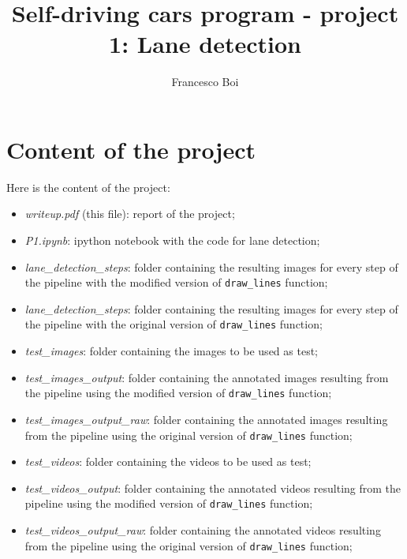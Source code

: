 \documentclass{article}
\author{Francesco Boi}
\title{Self-driving cars program - project  1: Lane detection}
\date{}
\let\cd\lstinline
\begin{document}
\lstset{escapechar=ç,style=customc}
\maketitle
\tableofcontents 
\section{Content of the project}
Here is the content of the project:
\begin{itemize}
\item \textit{writeup.pdf} (this file): report of the project;
\item \textit{P1.ipynb}: ipython notebook with the code for lane detection;
\item \textit{lane\_detection\_steps}: folder containing the resulting images for every step of the pipeline with the modified version of \cd+draw_lines+ function;
\item \textit{lane\_detection\_steps}: folder containing the resulting images for every step of the pipeline with the original version of \cd+draw_lines+ function;
\item \textit{test\_images}: folder containing the images to be used as test;
\item \textit{test\_images\_output}: folder containing the annotated images resulting from the pipeline using the modified version of \cd+draw_lines+ function;
\item \textit{test\_images\_output\_raw}: folder containing the annotated images resulting from the pipeline using the original version of \cd+draw_lines+ function;
\item \textit{test\_videos}: folder containing the videos to be used as test;
\item \textit{test\_videos\_output}: folder containing the annotated videos resulting from the pipeline using the modified version of \cd+draw_lines+ function;
\item \textit{test\_videos\_output\_raw}: folder containing the annotated videos resulting from the pipeline using the original version of \cd+draw_lines+ function;
\end{itemize}
\end{document}
